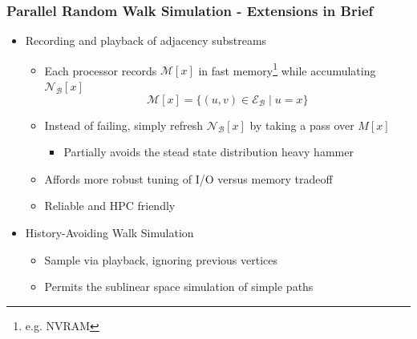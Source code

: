 \documentclass{beamer}
\begin{document}
\begin{frame}
\frametitle{Parallel Random Walk Simulation - Extensions in Brief}


\begin{itemize}
	\item Recording and playback of adjacency substreams
	\begin{itemize}
		\item Each processor records $\mathcal{M}[x]$ in fast memory\footnote{e.g. NVRAM} while accumulating $\mathcal{N}_\mathcal{B}[x]$
		\begin{equation*}
			\mathcal{M}[x] = \{ (u, v) \in \mathcal{E}_\mathcal{B} \mid u = x\}
		\end{equation*}
		\item Instead of failing, simply refresh $\mathcal{N}_\mathcal{B}[x]$ by taking a pass over $M[x]$
		\begin{itemize}
			\item Partially avoids the stead state distribution heavy hammer		
		\end{itemize}
		\item Affords more robust tuning of I/O versus memory tradeoff
		\item Reliable and HPC friendly
	\end{itemize}
	\item History-Avoiding Walk Simulation
	\begin{itemize}
		\item Sample via playback, ignoring previous vertices
		\item Permits the sublinear space simulation of simple paths
	\end{itemize}
\end{itemize}





\end{frame}



\end{document}
